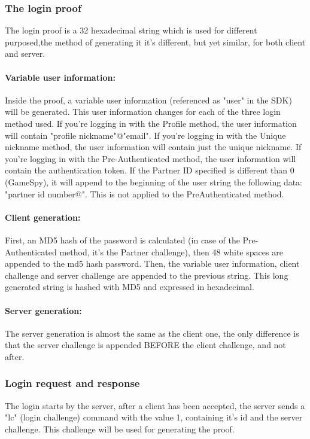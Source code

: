 \documentclass[oneside,titlepage,a4paper]{Definition/retrospy} %
\begin{document}
			\subsubsection{The login proof}
			The login proof is a 32 hexadecimal string which is used for different purposed,the method of generating it it's different, but yet similar, for both client and server.
			
			\paragraph{Variable user information:} Inside the proof, a variable user information (referenced as "user" in the SDK) will be generated. This user information changes for each of the three login method used.
				If you're logging in with the Profile method, the user information will contain "profile nickname"@"email".
				If you're logging in with the Unique nickname method, the user information will contain just the unique nickname.
				If you're logging in with the Pre-Authenticated method, the user information will contain the authentication token.
				If the Partner ID specified is different than 0 (GameSpy), it will append to the beginning of the user string the following data: "partner id number@". This is not applied to the PreAuthenticated method.
		
			\paragraph{Client generation:} First, an MD5 hash of the password is calculated (in case of the Pre-Authenticated method, it's the Partner challenge), then 48 white spaces are appended to the md5 hash password.
				Then, the variable user information, client challenge and server challenge are appended to the previous string. This long generated string is hashed with MD5 and expressed in hexadecimal.

			\paragraph{Server generation:} The server generation is almost the same as the client one, the only difference is that the server challenge is appended BEFORE the client challenge, and not after.
				
			\subsubsection{Login request and response}
			The login starts by the server, after a client has been accepted, the server sends a "lc" (login challenge) command with the value 1, containing it's id and the server challenge.
			This challenge will be used for generating the proof.
			
\end{document}
